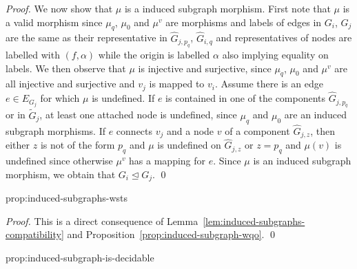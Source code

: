 \documentclass{llncs}
\newcommand{\indsubOrder}{\unlhd}
\begin{document}
{\begin{proof}
We now show that $\mu$ is a induced subgraph morphism. First note that
$\mu$ is a valid morphism since $\mu_q$, $\mu_0$ and $\mu^v$ are
morphisms and labels of edges in $G_i$, $G_j$ are the same as their
representative in $\widehat{G}_{j,p_q}$, $\widehat{G}_{i,q}$ and
representatives of nodes are labelled with $(f,\alpha)$ while the
origin is labelled $\alpha$ also implying equality on labels.  We then
observe that $\mu$ is injective and surjective, since $\mu_q$, $\mu_0$
and $\mu^v$ are all injective and surjective and $v_j$ is mapped to
$v_i$.  Assume there is an edge $e \in E_{G_j}$ for which $\mu$ is
undefined. If $e$ is contained in one of the components
$\widehat{G}_{j,p_q}$ or in $\widetilde{G}_j$, at least one attached
node is undefined, since $\mu_q$ and $\mu_0$ are an induced subgraph
morphisms. If $e$ connects $v_j$ and a node $v$ of a component
$\widehat{G}_{j,z}$, then either $z$ is not of the form $p_q$ and $\mu$ is
undefined on $\widehat{G}_{j,z}$ or $z = p_q$ and $\mu(v)$ is
undefined since otherwise $\mu^v$ has a mapping for $e$. Since $\mu$ is an
induced subgraph morphism, we obtain that $G_i \indsubOrder G_j$. \qed
\end{proof}

\begin{proposition_app}[\propIndsubgraphWSTSTitle]{prop:induced-subgraphs-wsts}
\propIndsubgraphWSTS
\end{proposition_app}

\begin{proof}
This is a direct consequence of Lemma~\ref{lem:induced-subgraphs-compatibility} 
and Proposition~\ref{prop:induced-subgraph-wqo}. \qed
\end{proof}

\begin{proposition_app}{prop:induced-subgraph-is-decidable}
\propIndsubgraphDecidable
\end{proposition_app}

}
\end{document}
